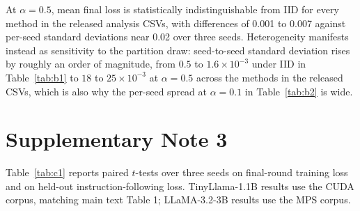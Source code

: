 \documentclass[pdflatex,sn-nature]{sn-jnl}
\begin{document}
At $\alpha{=}0.5$, mean final loss is statistically indistinguishable from IID for every method in the released analysis CSVs, with differences of 0.001 to 0.007 against per-seed standard deviations near 0.02 over three seeds. Heterogeneity manifests instead as sensitivity to the partition draw: seed-to-seed standard deviation rises by roughly an order of magnitude, from $0.5$ to $1.6 \times 10^{-3}$ under IID in Table~\ref{tab:b1} to $18$ to $25 \times 10^{-3}$ at $\alpha{=}0.5$ across the methods in the released CSVs, which is also why the per-seed spread at $\alpha{=}0.1$ in Table~\ref{tab:b2} is wide.

\section*{Supplementary Note 3}
\label{app:stats}
Table~\ref{tab:c1} reports paired $t$-tests over three seeds on final-round training loss and on held-out instruction-following loss. TinyLlama-1.1B results use the CUDA corpus, matching main text Table 1; LLaMA-3.2-3B results use the MPS corpus.
\end{document}
